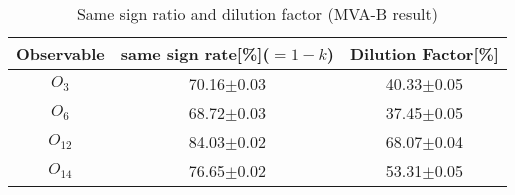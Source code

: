 		\begin{center}
		\setlength{\tabcolsep}{12pt}
		\begin{longtable}{ c | c c }
		\caption{Same sign ratio and dilution factor (MVA-B result)} \\
		Observable & same sign rate[\%]($=1-k$) & Dilution Factor[\%] \\
		\hline
		$O_{3}$ & 70.16$\pm$0.03  &  40.33$\pm$0.05  \\
		$O_{6}$ &  68.72$\pm$0.03  &  37.45$\pm$0.05  \\
		$O_{12}$ &  84.03$\pm$0.02  &  68.07$\pm$0.04  \\
		$O_{14}$ &  76.65$\pm$0.02  &  53.31$\pm$0.05  \\
		\hline
		\end{longtable}
		\label{Dilution:tb:MVAB}
		\end{center}


\FloatBarrier
